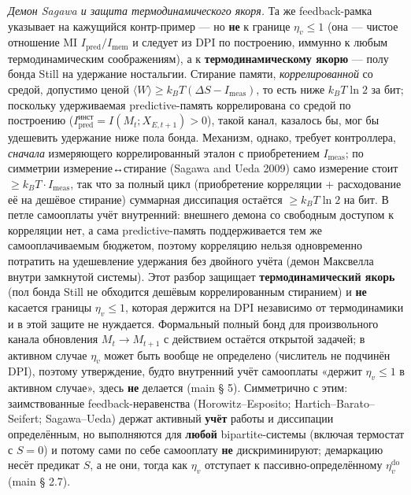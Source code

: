 \documentclass[pdflatex,sn-mathphys-ay]{sn-jnl}
\begin{document}
\emph{Демон Sagawa и защита термодинамического якоря.} Та же feedback-рамка указывает на кажущийся контр-пример --- но \textbf{не} к границе \(\eta_v \le 1\) (она --- чистое отношение MI \(I_{\text{pred}}/I_{\text{mem}}\) и следует из DPI по построению, иммунно к любым термодинамическим соображениям), а к \textbf{термодинамическому якорю} --- полу бонда Still на удержание ностальгии. Стирание памяти, \emph{коррелированной} со средой, допустимо ценой \(\langle W\rangle \ge k_B T(\Delta S - I_{\text{meas}})\), то есть ниже \(k_B T \ln 2\) за бит; поскольку удерживаемая predictive-память коррелирована со средой по построению (\(I_{\text{pred}}^{\text{инст}} = I(M_t; X_{E,t+1}) > 0\)), такой канал, казалось бы, мог бы удешевить удержание ниже пола бонда. Механизм, однако, требует контроллера, \emph{сначала} измеряющего коррелированный эталон с приобретением \(I_{\text{meas}}\); по симметрии измерение↔стирание (Sagawa and Ueda 2009) само измерение стоит \(\ge k_B T \cdot I_{\text{meas}}\), так что за полный цикл (приобретение корреляции + расходование её на дешёвое стирание) суммарная диссипация остаётся \(\ge k_B T \ln 2\) на бит. В петле самооплаты учёт внутренний: внешнего демона со свободным доступом к корреляции нет, а сама predictive-память поддерживается тем же самооплачиваемым бюджетом, поэтому корреляцию нельзя одновременно потратить на удешевление удержания без двойного учёта (демон Максвелла внутри замкнутой системы). Этот разбор защищает \textbf{термодинамический якорь} (пол бонда Still не обходится дешёвым коррелированным стиранием) и \textbf{не} касается границы \(\eta_v \le 1\), которая держится на DPI независимо от термодинамики и в этой защите не нуждается. Формальный полный бонд для произвольного канала обновления \(M_t \to M_{t+1}\) с действием остаётся открытой задачей; в активном случае \(\eta_v\) может быть вообще не определено (числитель не подчинён DPI), поэтому утверждение, будто внутренний учёт самооплаты «держит \(\eta_v \le 1\) в активном случае», здесь \textbf{не} делается (main § 5). Симметрично с этим: заимствованные feedback-неравенства (Horowitz--Esposito; Hartich--Barato--Seifert; Sagawa--Ueda) держат активный \textbf{учёт} работы и диссипации определённым, но выполняются для \textbf{любой} bipartite-системы (включая термостат с \(S = 0\)) и потому сами по себе самооплату \textbf{не} дискриминируют; демаркацию несёт предикат \(S\), а не они, тогда как \(\eta_v\) отступает к пассивно-определённому \(\eta_v^{\mathrm{do}}\) (main § 2.7).
\end{document}
